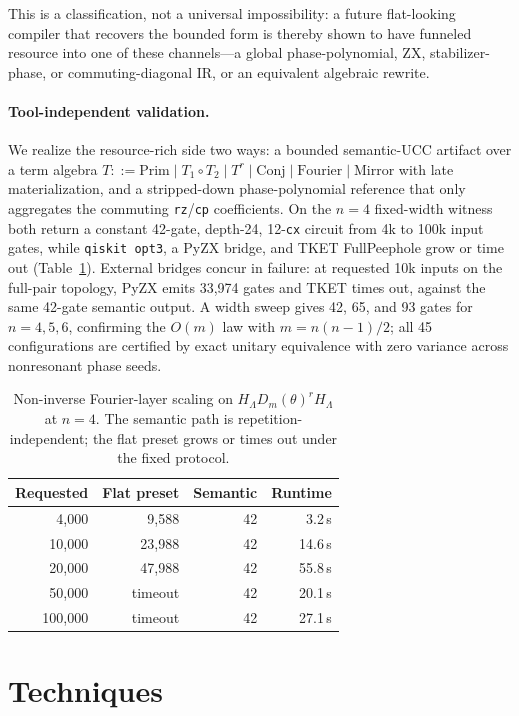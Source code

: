 \documentclass[a4paper]{article}
\begin{document}
This is a classification, not a universal impossibility: a future flat-looking compiler that recovers
the bounded form is thereby shown to have funneled resource into one of these channels---a global
phase-polynomial, ZX, stabilizer-phase, or commuting-diagonal IR, or an equivalent algebraic rewrite.

\paragraph{Tool-independent validation.}
We realize the resource-rich side two ways: a bounded semantic-UCC artifact over a term algebra
$T ::= \mathrm{Prim}\mid T_1\!\circ\!T_2\mid T^r\mid \mathrm{Conj}\mid \mathrm{Fourier}\mid
\mathrm{Mirror}$ with late materialization, and a stripped-down phase-polynomial reference that only
aggregates the commuting \texttt{rz}/\texttt{cp} coefficients. On the $n=4$ fixed-width witness both
return a constant 42-gate, depth-24, 12-\texttt{cx} circuit from 4k to 100k input gates, while
\texttt{qiskit opt3}, a PyZX bridge, and TKET FullPeephole grow or time out
(Table~\ref{tab:headline}). External bridges concur in failure: at requested 10k inputs on the
full-pair topology, PyZX emits 33{,}974 gates and TKET times out, against the same 42-gate semantic
output. A width sweep gives 42, 65, and 93 gates for $n=4,5,6$, confirming the $O(m)$ law with
$m=n(n-1)/2$; all 45 configurations are certified by exact unitary equivalence with zero variance
across nonresonant phase seeds.

\begin{table}[t]
\centering
\small
\caption{Non-inverse Fourier-layer scaling on $H_\Lambda D_m(\theta)^r H_\Lambda$ at $n=4$. The
semantic path is repetition-independent; the flat preset grows or times out under the fixed protocol.}
\begin{tabular}{rrrr}
\toprule
Requested & Flat preset & Semantic & Runtime \\
\midrule
4{,}000   & 9{,}588  & 42 & 3.2\,s \\
10{,}000  & 23{,}988 & 42 & 14.6\,s \\
20{,}000  & 47{,}988 & 42 & 55.8\,s \\
50{,}000  & timeout  & 42 & 20.1\,s \\
100{,}000 & timeout  & 42 & 27.1\,s \\
\bottomrule
\end{tabular}
\label{tab:headline}
\end{table}

\section{Techniques}
\end{document}
